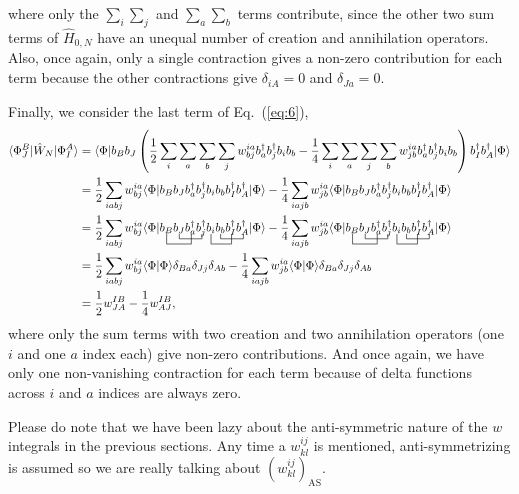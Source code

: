 \documentclass[a4paper]{article}
\newcommand{\eq} [1]{Eq.\ (\ref{eq:#1})}
\newcommand{\nn}{\nonumber}
\begin{document}
where only the $\sum_i\sum_j$ and $\sum_a\sum_b$ terms contribute, since the other two sum terms of $\hat{H}_{0,N}$ have an unequal number of creation and annihilation operators. Also, once again, only a single contraction gives a non-zero contribution for each term because the other contractions give $\delta_{iA}=0$ and $\delta_{Ja}=0$.

Finally, we consider the last term of \eq{6},
\begin{align}
\langle \Phi^B_J | \hat{W}_N | \Phi^A_I \rangle &= \langle \Phi |b_Bb_J \left( \frac{1}{2}\sum_i\sum_a\sum_b\sum_j w^{ia}_{bj}b_a^\dagger b_j^\dagger b_i b_b - \frac{1}{4}\sum_i\sum_a\sum_j\sum_b w^{ia}_{jb} b_a^\dagger b_j^\dagger b_i b_b\right) b_I^\dagger b_A^\dagger| \Phi \rangle \nn\\
&= \frac{1}{2}\sum_{iabj} w^{ia}_{bj} \langle \Phi |b_Bb_J b_a^\dagger b_j^\dagger b_i b_b b_I^\dagger b_A^\dagger| \Phi \rangle - \frac{1}{4}\sum_{iajb} w^{ia}_{jb}\langle \Phi |b_Bb_J b_a^\dagger b_j^\dagger b_i b_b b_I^\dagger b_A^\dagger| \Phi \rangle \nn\\
&= \frac{1}{2}\sum_{iabj} w^{ia}_{bj} \langle \Phi | \bcontraction[2ex]{}{b_B}{b_J}{b_a^\dagger}\bcontraction{b_B}{b_J}{b_a^\dagger}{b_j^\dagger}\bcontraction[2ex]{b_Bb_J b_a^\dagger b_j^\dagger}{b_i}{b_b}{b_I^\dagger}\bcontraction{b_Bb_J b_a^\dagger b_j^\dagger b_i}{b_b}{b_I^\dagger}{b_A^\dagger}b_Bb_J b_a^\dagger b_j^\dagger b_i b_b b_I^\dagger b_A^\dagger| \Phi \rangle - \frac{1}{4}\sum_{iajb} w^{ia}_{jb}\langle \Phi |\bcontraction[2ex]{}{b_B}{b_J}{b_a^\dagger}\bcontraction{b_B}{b_J}{b_a^\dagger}{b_j^\dagger}\bcontraction[2ex]{b_Bb_J b_a^\dagger b_j^\dagger}{b_i}{b_b}{b_I^\dagger}\bcontraction{b_Bb_J b_a^\dagger b_j^\dagger b_i}{b_b}{b_I^\dagger}{b_A^\dagger}b_Bb_J b_a^\dagger b_j^\dagger b_i b_b b_I^\dagger b_A^\dagger| \Phi \rangle \nn\\
&= \frac{1}{2}\sum_{iabj} w^{ia}_{bj} \langle \Phi | \Phi \rangle\delta_{Ba}\delta_{Jj}\delta_{Ab} - \frac{1}{4}\sum_{iajb} w^{ia}_{jb}\langle \Phi | \Phi \rangle\delta_{Ba}\delta_{Jj}\delta_{Ab} \nn\\ 
&= \frac{1}{2}w^{IB}_{JA} - \frac{1}{4}w^{IB}_{AJ},
\end{align}
where only the sum terms with two creation and two annihilation operators (one $i$ and one $a$ index each) give non-zero contributions. And once again, we have only one non-vanishing contraction for each term because of delta functions across $i$ and $a$ indices are always zero. 

Please do note that we have been lazy about the anti-symmetric nature of the $w$ integrals in the previous sections. Any time a $w^{ij}_{kl}$ is mentioned, anti-symmetrizing is assumed so we are really talking about $(w^{ij}_{kl})_{\text{AS}}$.
\end{document}
